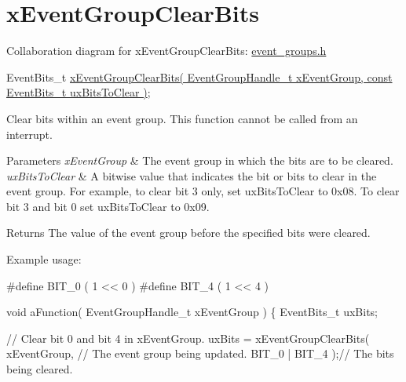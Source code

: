 \hypertarget{group__x_event_group_clear_bits}{}\section{x\+Event\+Group\+Clear\+Bits}
\label{group__x_event_group_clear_bits}
Collaboration diagram for x\+Event\+Group\+Clear\+Bits\+:
\hyperlink{event__groups_8h}{event\+\_\+groups.\+h} 
\begin{DoxyPre}
   EventBits\_t \hyperlink{event__groups_8h_a0fb72cfdd4f0d5f86d955fc3af448f2a}{xEventGroupClearBits( EventGroupHandle\_t xEventGroup, const EventBits\_t uxBitsToClear )};
\end{DoxyPre}


Clear bits within an event group. This function cannot be called from an interrupt.


\begin{DoxyParams}{Parameters}
{\em x\+Event\+Group} & The event group in which the bits are to be cleared.\\
\hline
{\em ux\+Bits\+To\+Clear} & A bitwise value that indicates the bit or bits to clear in the event group. For example, to clear bit 3 only, set ux\+Bits\+To\+Clear to 0x08. To clear bit 3 and bit 0 set ux\+Bits\+To\+Clear to 0x09.\\
\hline
\end{DoxyParams}
\begin{DoxyReturn}{Returns}
The value of the event group before the specified bits were cleared.
\end{DoxyReturn}
Example usage\+: 
\begin{DoxyPre}
  #define BIT\_0 ( 1 << 0 )
  #define BIT\_4 ( 1 << 4 )\end{DoxyPre}



\begin{DoxyPre}  void aFunction( EventGroupHandle\_t xEventGroup )
  \{
  EventBits\_t uxBits;\end{DoxyPre}



\begin{DoxyPre}    // Clear bit 0 and bit 4 in xEventGroup.
    uxBits = xEventGroupClearBits(
                            xEventGroup,    // The event group being updated.
                            BIT\_0 | BIT\_4 );// The bits being cleared.\end{DoxyPre}



